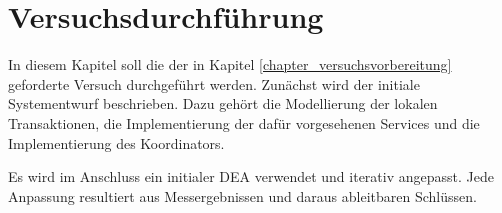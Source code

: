 \chapter{Versuchsdurchführung}

In diesem Kapitel soll die der in Kapitel \ref{chapter_versuchsvorbereitung} geforderte Versuch durchgeführt werden. Zunächst wird der initiale Systementwurf beschrieben. Dazu gehört die Modellierung der lokalen Transaktionen, die Implementierung der dafür vorgesehenen Services und die Implementierung des Koordinators.

Es wird im Anschluss ein initialer DEA verwendet und iterativ angepasst. Jede Anpassung resultiert aus Messergebnissen und daraus ableitbaren Schlüssen.





















